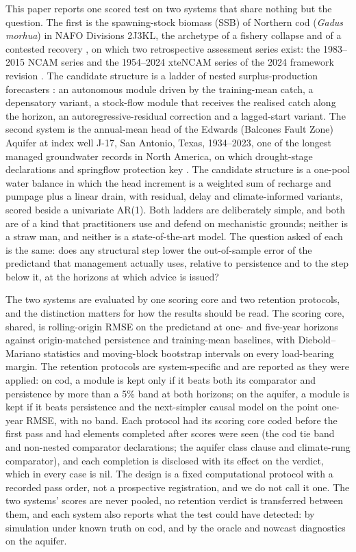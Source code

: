 \documentclass[preprint,11pt,authoryear]{elsarticle}
\theoremstyle{definition}
\theoremstyle{remark}
\begin{document}
This paper reports one scored test on two systems that share nothing but the question. The first is the spawning-stock biomass (SSB) of Northern cod (\emph{Gadus morhua}) in NAFO Divisions 2J3KL, the archetype of a fishery collapse \citep{Hutchings1994,Myers1997} and of a contested recovery \citep{RoseRowe2015,Rose2026}, on which two retrospective assessment series exist: the 1983--2015 NCAM series \citep{Cadigan2016,DFO2016} and the 1954--2024 xteNCAM series of the 2024 framework revision \citep{Regular2025}. The candidate structure is a ladder of nested surplus-production forecasters \citep{Schaefer1954,Pella1969}: an autonomous module driven by the training-mean catch, a depensatory variant, a stock-flow module that receives the realised catch along the horizon, an autoregressive-residual correction and a lagged-start variant. The second system is the annual-mean head of the Edwards (Balcones Fault Zone) Aquifer at index well J-17, San Antonio, Texas, 1934--2023, one of the longest managed groundwater records in North America, on which drought-stage declarations and springflow protection key \citep{EAA2024}. The candidate structure is a one-pool water balance in which the head increment is a weighted sum of recharge and pumpage plus a linear drain, with residual, delay and climate-informed variants, scored beside a univariate AR(1). Both ladders are deliberately simple, and both are of a kind that practitioners use and defend on mechanistic grounds; neither is a straw man, and neither is a state-of-the-art model. The question asked of each is the same: does any structural step lower the out-of-sample error of the predictand that management actually uses, relative to persistence and to the step below it, at the horizons at which advice is issued?

The two systems are evaluated by one scoring core and two retention protocols, and the distinction matters for how the results should be read. The scoring core, shared, is rolling-origin RMSE on the predictand at one- and five-year horizons against origin-matched persistence and training-mean baselines, with Diebold--Mariano statistics and moving-block bootstrap intervals on every load-bearing margin. The retention protocols are system-specific and are reported as they were applied: on cod, a module is kept only if it beats both its comparator and persistence by more than a 5\% band at both horizons; on the aquifer, a module is kept if it beats persistence and the next-simpler causal model on the point one-year RMSE, with no band. Each protocol had its scoring core coded before the first pass and had elements completed after scores were seen (the cod tie band and non-nested comparator declarations; the aquifer class clause and climate-rung comparator), and each completion is disclosed with its effect on the verdict, which in every case is nil. The design is a fixed computational protocol with a recorded pass order, not a prospective registration, and we do not call it one. The two systems' scores are never pooled, no retention verdict is transferred between them, and each system also reports what the test could have detected: by simulation under known truth on cod, and by the oracle and nowcast diagnostics on the aquifer.
\end{document}
